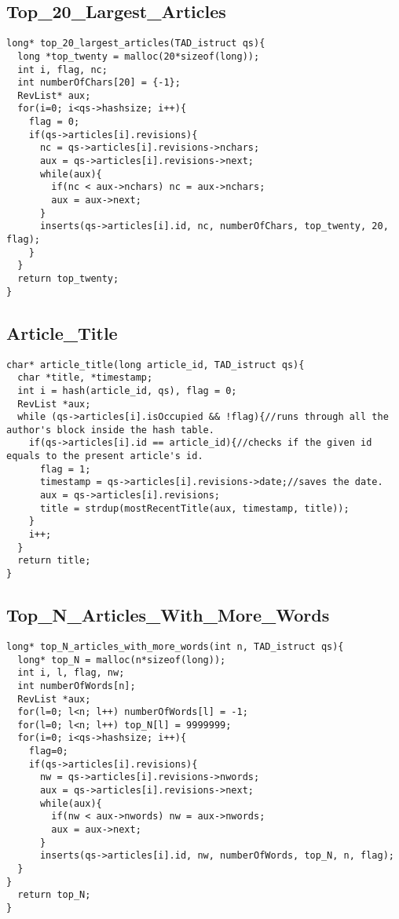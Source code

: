 \documentclass{article}
\begin{document}
\clearpage

\subsection{Top\_20\_Largest\_Articles} \label{Top20}

\begin{lstlisting}
long* top_20_largest_articles(TAD_istruct qs){
  long *top_twenty = malloc(20*sizeof(long));
  int i, flag, nc;
  int numberOfChars[20] = {-1};
  RevList* aux;
  for(i=0; i<qs->hashsize; i++){
    flag = 0;
    if(qs->articles[i].revisions){
      nc = qs->articles[i].revisions->nchars;
      aux = qs->articles[i].revisions->next;
      while(aux){
        if(nc < aux->nchars) nc = aux->nchars;
        aux = aux->next;
      }
      inserts(qs->articles[i].id, nc, numberOfChars, top_twenty, 20, flag);
    }
  }
  return top_twenty;
}
\end{lstlisting}
\subsection{Article\_Title} \label{Article Title}

\begin{lstlisting}
char* article_title(long article_id, TAD_istruct qs){
  char *title, *timestamp;
  int i = hash(article_id, qs), flag = 0;
  RevList *aux;
  while (qs->articles[i].isOccupied && !flag){//runs through all the author's block inside the hash table.
    if(qs->articles[i].id == article_id){//checks if the given id equals to the present article's id.
      flag = 1;
      timestamp = qs->articles[i].revisions->date;//saves the date.
      aux = qs->articles[i].revisions;
      title = strdup(mostRecentTitle(aux, timestamp, title));
    }
    i++;
  }
  return title;
}
\end{lstlisting}

\newpage

\subsection{Top\_N\_Articles\_With\_More\_Words} \label{TopN}

\begin{lstlisting}
long* top_N_articles_with_more_words(int n, TAD_istruct qs){
  long* top_N = malloc(n*sizeof(long));
  int i, l, flag, nw;
  int numberOfWords[n];
  RevList *aux;
  for(l=0; l<n; l++) numberOfWords[l] = -1;
  for(l=0; l<n; l++) top_N[l] = 9999999;
  for(i=0; i<qs->hashsize; i++){
    flag=0;
    if(qs->articles[i].revisions){
      nw = qs->articles[i].revisions->nwords;
      aux = qs->articles[i].revisions->next;
      while(aux){
        if(nw < aux->nwords) nw = aux->nwords;
        aux = aux->next;
      }
      inserts(qs->articles[i].id, nw, numberOfWords, top_N, n, flag);
  }
}
  return top_N;
}
\end{lstlisting}
\end{document}
